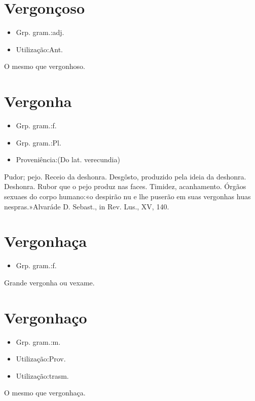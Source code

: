 \documentclass{article}
\begin{document}
\section{Vergonçoso}
\begin{itemize}
\item {Grp. gram.:adj.}
\end{itemize}
\begin{itemize}
\item {Utilização:Ant.}
\end{itemize}
O mesmo que \textunderscore vergonhoso\textunderscore .
\section{Vergonha}
\begin{itemize}
\item {Grp. gram.:f.}
\end{itemize}
\begin{itemize}
\item {Grp. gram.:Pl.}
\end{itemize}
\begin{itemize}
\item {Proveniência:(Do lat. \textunderscore verecundia\textunderscore )}
\end{itemize}
Pudor; pejo.
Receio da deshonra.
Desgôsto, produzido pela ideia da deshonra.
Deshonra.
Rubor que o pejo produz nas faces.
Timidez, acanhamento.
Órgãos sexuaes do corpo humano:«\textunderscore o despirão nu e lhe puserão em suas vergonhas huas nespras.\textunderscore »\textunderscore Alvará\textunderscore  de D. Sebast., in \textunderscore Rev. Lus.\textunderscore , XV, 140.
\section{Vergonhaça}
\begin{itemize}
\item {Grp. gram.:f.}
\end{itemize}
Grande vergonha ou vexame.
\section{Vergonhaço}
\begin{itemize}
\item {Grp. gram.:m.}
\end{itemize}
\begin{itemize}
\item {Utilização:Prov.}
\end{itemize}
\begin{itemize}
\item {Utilização:trasm.}
\end{itemize}
O mesmo que \textunderscore vergonhaça\textunderscore .
\end{document}
